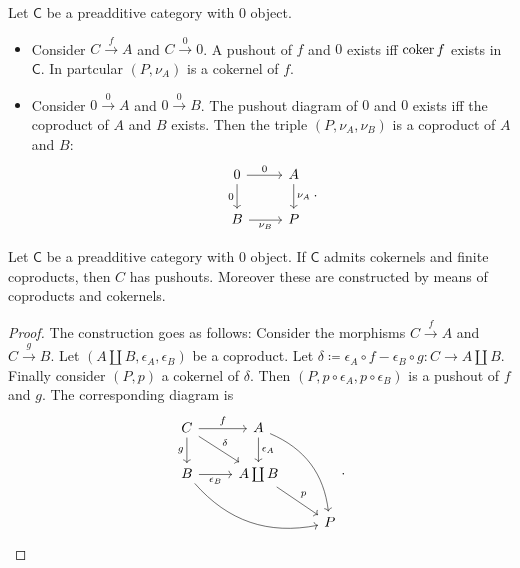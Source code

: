 \begin{ex}
	Let $\mathsf{C}$ be a preadditive category with $0$ object.
	\begin{itemize}
		\item Consider $C \xrightarrow{f} A$ and $C \xrightarrow{0} 0$.
			A pushout of $f$ and $0$ exists iff $\operatorname{coker} f$ exists in $\mathsf{C}$.
			In partcular $\left(P, \nu_A \right)$ is a cokernel of $f$.
		\item Consider $0 \xrightarrow{0} A$ and $0 \xrightarrow{0} B$.
			The pushout diagram of $0$ and $0$ exists iff the coproduct of $A$ and $B$ exists.
			Then the triple $ \left(P, \nu_A, \nu_B\right)$ is a coproduct of $A$ and $B$:
			\begin{equation}
			\begin{tikzcd}
				0 \arrow[r, "0", rightarrow] \arrow[d, "0"', rightarrow] &
				A \arrow[d, "\nu_A", rightarrow] \\
				B \arrow[r, "\nu_B"', rightarrow] &
				P
			\end{tikzcd}
			.\end{equation} 
	\end{itemize}
\end{ex} 

\begin{prop}
	Let $\mathsf{C}$ be a preadditive category with $0$ object.
	If $\mathsf{C}$ admits cokernels and finite coproducts, then $C$ has pushouts.
	Moreover these are constructed by means of coproducts and cokernels.
\end{prop} 
\begin{proof}
	The construction goes as follows:
	Consider the morphisms $C \xrightarrow{f} A$ and $C \xrightarrow{g} B$.
	Let $\left(A \coprod B, \epsilon_A, \epsilon_B\right)$ be a coproduct.
	Let $\delta \coloneqq \epsilon_A \circ f - \epsilon_B \circ g:C \to A \coprod B$.
	Finally consider $\left(P, p\right)$ a cokernel of $\delta$.
	Then $\left(P, p \circ \epsilon_A, p \circ \epsilon_B\right)$ is a pushout of $f$ and $g$.
	The corresponding diagram is
	\begin{equation}
	\begin{tikzcd}
		C \arrow[rd, "\delta", rightarrow] \arrow[r, "f", rightarrow] \arrow[d, "g"', rightarrow] & 
		A \arrow[d, "\epsilon_A", rightarrow] \arrow[ddr, "", rightarrow, bend left] & \\
		B \arrow[r, "\epsilon_B"', rightarrow] \arrow[rrd, "", rightarrow, bend right] &
		A \coprod B \arrow[rd, "p", rightarrow] & \\
		& & P
	\end{tikzcd}
	.\end{equation} 
\end{proof}

